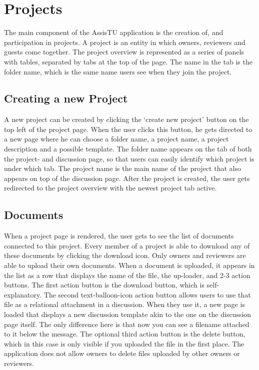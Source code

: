 \section{Projects}

The main component of the AssisTU application is the creation of, and participation in projects. A project is an entity in which owners, reviewers and 
guests come together. 
The project overview is represented as a series of panels with tables, separated by tabs at the top of the page. The name in the tab is the folder 
name, which is the same name users see when they join the project. 

\subsection{Creating a new Project}

A new project can be created by clicking the `create new project' button on the top left of the project page. When the user clicks this button,
he gets directed to a new page where he can choose a folder name, a project name, a project description and a possible template. The folder name
appears on the tab of both the project- and discussion page, so that users can easily identify which project is under which tab. The project
name is the main name of the project that also appears on top of the discussion page. After the project is created, the user gets redirected
to the project overview with the newest project tab active.

\subsection{Documents}

When a project page is rendered, the user gets to see the list of documents connected to this project. Every member of a project is able to download
any of these documents by clicking the download icon. Only owners and reviewers are able to upload their own documents. When a document is uploaded,
it appears in the list as a row that displays the name of the file, the up-loader, and 2-3 action buttons. The first action button is the download 
button, which is self-explanatory. The second text-balloon-icon action button allows users to use that file as a relational attachment in a discussion.
When they use it, a new page is loaded that displays a new discussion template akin to the one on the discussion page itself. The only difference here
is that now you can see a filename attached to it below the message. The optional third action button is the delete button, which in this case is
only visible if you uploaded the file in the first place. The application does not allow owners to delete files uploaded by other owners or reviewers.

